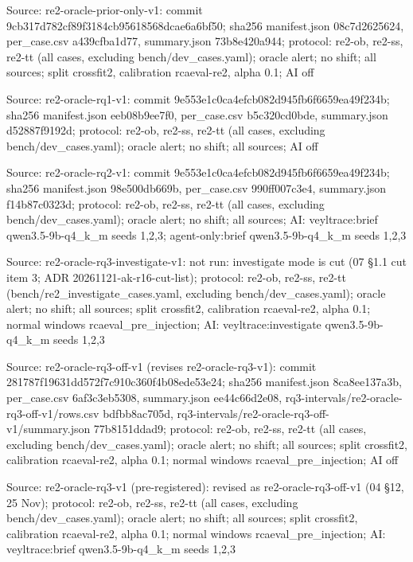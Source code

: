 \noindent Source: re2-oracle-prior-only-v1: commit 9cb317d782cf89f3184cb95618568dcae6a6bf50; sha256 manifest.json 08c7d2625624, per\_case.csv a439cfba1d77, summary.json 73b8e420a944; protocol: re2-ob, re2-ss, re2-tt (all cases, excluding bench/\allowbreak{}dev\_cases.yaml); oracle alert; no shift; all sources; split crossfit2, calibration rcaeval-re2, alpha 0.1; AI off\par
\noindent Source: re2-oracle-rq1-v1: commit 9e553e1c0ca4efcb082d945fb6f6659ea49f234b; sha256 manifest.json eeb08b9ee7f0, per\_case.csv b5c320cd0bde, summary.json d52887f9192d; protocol: re2-ob, re2-ss, re2-tt (all cases, excluding bench/\allowbreak{}dev\_cases.yaml); oracle alert; no shift; all sources; AI off\par
\noindent Source: re2-oracle-rq2-v1: commit 9e553e1c0ca4efcb082d945fb6f6659ea49f234b; sha256 manifest.json 98e500db669b, per\_case.csv 990ff007c3e4, summary.json f14b87c0323d; protocol: re2-ob, re2-ss, re2-tt (all cases, excluding bench/\allowbreak{}dev\_cases.yaml); oracle alert; no shift; all sources; AI: veyltrace:brief qwen3.5-9b-q4\_k\_m seeds 1,2,3; agent-only:brief qwen3.5-9b-q4\_k\_m seeds 1,2,3\par
\noindent Source: re2-oracle-rq3-investigate-v1: not run: investigate mode is cut (07 \S{}1.1 cut item 3; ADR 20261121-ak-r16-cut-list); protocol: re2-ob, re2-ss, re2-tt (bench/\allowbreak{}re2\_investigate\_cases.yaml, excluding bench/\allowbreak{}dev\_cases.yaml); oracle alert; no shift; all sources; split crossfit2, calibration rcaeval-re2, alpha 0.1; normal windows rcaeval\_pre\_injection; AI: veyltrace:investigate qwen3.5-9b-q4\_k\_m seeds 1,2,3\par
\noindent Source: re2-oracle-rq3-off-v1 (revises re2-oracle-rq3-v1): commit 281787f19631dd572f7c910c360f4b08ede53e24; sha256 manifest.json 8ca8ee137a3b, per\_case.csv 6af3c3eb5308, summary.json ee44c66d2e08, rq3-intervals/\allowbreak{}re2-oracle-rq3-off-v1/\allowbreak{}rows.csv bdfbb8ac705d, rq3-intervals/\allowbreak{}re2-oracle-rq3-off-v1/\allowbreak{}summary.json 77b8151ddad9; protocol: re2-ob, re2-ss, re2-tt (all cases, excluding bench/\allowbreak{}dev\_cases.yaml); oracle alert; no shift; all sources; split crossfit2, calibration rcaeval-re2, alpha 0.1; normal windows rcaeval\_pre\_injection; AI off\par
\noindent Source: re2-oracle-rq3-v1 (pre-registered): revised as re2-oracle-rq3-off-v1 (04 \S{}12, 25 Nov); protocol: re2-ob, re2-ss, re2-tt (all cases, excluding bench/\allowbreak{}dev\_cases.yaml); oracle alert; no shift; all sources; split crossfit2, calibration rcaeval-re2, alpha 0.1; normal windows rcaeval\_pre\_injection; AI: veyltrace:brief qwen3.5-9b-q4\_k\_m seeds 1,2,3\par
